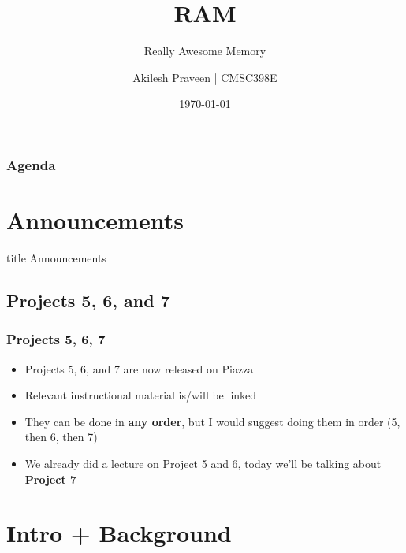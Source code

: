 \documentclass{beamer}
\title{RAM}
\subtitle{Really Awesome Memory}
\author[CMSC389E]{Akilesh Praveen | CMSC398E}
\institute{UMD}
\date{\today}
\begin{document}
    \begin{frame}
        \titlepage
    \end{frame}
    
    \begin{frame}
        \frametitle{Agenda}
        \tableofcontents
    \end{frame}
    
    \section{Announcements}
    
        \begin{frame}
                \vfill
                \centering
                \begin{beamercolorbox}[sep=8pt,center,shadow=true,rounded=true]{title}
                    Announcements\par%
                \end{beamercolorbox}
                \vfill
             \end{frame}
    
        \subsection{Projects 5, 6, and 7}
        
            
            
            \begin{frame}
                \frametitle{Projects 5, 6, 7}
                \begin{itemize}
                    \item Projects 5, 6, and 7 are now released on Piazza
                    \item Relevant instructional material is/will be linked
                    \item They can be done in \textbf{any order}, but I would suggest doing them in order (5, then 6, then 7)
                    \item We already did a lecture on Project 5 and 6, today we'll be talking about \textbf{Project 7}
                    
                \end{itemize}
            \end{frame}
            
            
    \section{Intro + Background}
    
\end{document}
